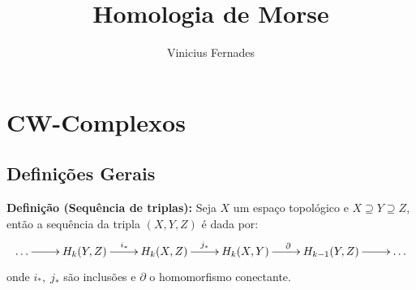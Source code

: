 \documentclass[12pt]{book}
\newcommand{\homologiarel}[3]{H_{#1}(#2,#3)}
\newcommand{\definicaonomeada}[2]{\vspace{2mm} \textbf{Definição (#1):}{ #2}}
\begin{document}
	
	\title{Homologia de Morse}
	
	\author{Vinicius Fernades}
	
	\maketitle
	
	\chapter{CW-Complexos}
	\section{Definições Gerais}
	\definicaonomeada{Sequência de triplas}{Seja $X$ um espaço topológico e $X \supseteq Y \supseteq Z$, então a sequência da tripla $(X,Y,Z)$ é dada por:
	\[
	\xymatrix{
	\dots \ar[r] & \homologiarel{k}{Y}{Z} \ar[r]^{i_{*}} & \homologiarel{k}{X}{Z} \ar[r]^{j_{*}} & \homologiarel{k}{X}{Y} \ar[r]^{\partial} & \homologiarel{k-1}{Y}{Z} \ar[r] & \dots
	}
	\]
	onde $i_{*},\;j_{*}$ são inclusões e $\partial$ o homomorfismo conectante.
	}
	
\end{document}
